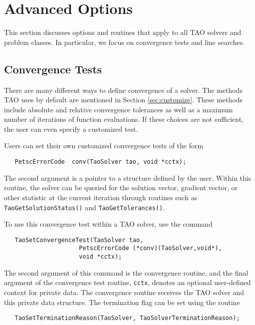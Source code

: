 
\chapter{Advanced Options}

This section discusses options and routines that apply to all TAO
solvers and problem classes.  In particular, we focus on
convergence tests and line searches.



\section{Convergence Tests}
\label{sec:Taoconvergence}

There are many different ways to define convergence of a solver.
The methods TAO uses by default are mentioned in 
Section \ref{sec:customize}.
These methods include absolute and relative convergence tolerances as well
as a maximum number of iterations of function evaluations.
If these choices are not sufficient, 
the user can even specify a customized test. 

Users can set their own customized convergence tests of the form
\begin{verbatim}
   PetscErrorCode  conv(TaoSolver tao, void *cctx);
\end{verbatim}
\noindent
The second argument
is a pointer to a structure defined by the user.
Within this routine, the solver
can be queried for the solution vector, gradient vector,
or other statistic at the current iteration through routines such as
{\tt TaoGetSolutionStatus()} and  {\tt TaoGetTolerances()}.

To use this convergence test within a TAO solver, use
the command 
\begin{verbatim}
   TaoSetConvergenceTest(TaoSolver tao,
                     PetscErrorCode (*conv)(TaoSolver,void*),
                     void *cctx);
\end{verbatim}
\noindent
The second argument of this command is the convergence routine, and the
final argument of the convergence test routine, {\tt cctx},
denotes an optional user-defined context for private data.  
The convergence routine receives the TAO solver and this private data
structure. 
The termination flag can be set using the routine
\begin{verbatim}
   TaoSetTerminationReason(TaoSolver, TaoSolverTerminationReason);
\end{verbatim}
\noindent



